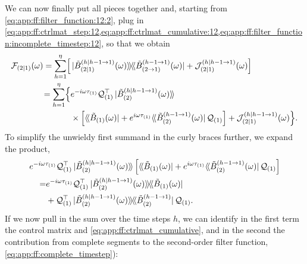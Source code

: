 We can now finally put all pieces together and, starting from \cref{eq:app:ff:filter_function:12:2}, plug in \cref{eq:app:ff:ctrlmat_step:12,eq:app:ff:ctrlmat_cumulative:12,eq:app:ff:filter_function:incomplete_timestep:12}, so that we obtain
\begin{align}
    \FF_{(2|1)}(\omega) = \sum_{h=1}^{\eta}\Bigl[
                                & \dop*{\Bt_{(2|1)}\gth{h|h-1\to 1}(\omega)}{\Bt_{(2\to1)}\gth{h-1\to 1}(\omega)}
                                    + \mc{J}_{(2|1)}\gth{h|h-1\to 1}(\omega)\Bigr] \notag \\
                        = \sum_{h=1}^{\eta}\Bigl\lbrace
                                & \e^{-\i\omega\tau_{(1)}}\liouvQ_{(1)}\transpose\dket*{\Bt_{(2)}\gth{h|h-1\to 1}(\omega)} \notag \\
                                & \times\Bigl[
                                        \dbra*{\Bt_{(1)}(\omega)} + \e^{\i\omega\tau_{(1)}}\dbra*{\Bt_{(2)}\gth{h-1\to 1}(\omega)}\liouvQ_{(1)}
                                    \Bigr] + \mc{J}_{(2|1)}\gth{h|h-1\to 1}(\omega)
                                \Bigr\rbrace.
\end{align}
To simplify the unwieldy first summand in the curly braces further, we expand the product,
\begin{align}\label{eq:app:unwieldy_term}
    \MoveEqLeft \e^{-\i\omega\tau_{(1)}}\liouvQ_{(1)}\transpose\dket*{\Bt_{(2)}\gth{h|h-1\to 1}(\omega)}\left[
                \dbra*{\Bt_{(1)}(\omega)} + \e^{\i\omega\tau_{(1)}}\dbra*{\Bt_{(2)}\gth{h-1\to 1}(\omega)}\liouvQ_{(1)}
            \right] \notag \\
        = & \e^{-\i\omega\tau_{(1)}}\liouvQ_{(1)}\transpose\dop*{\Bt_{(2)}\gth{h|h-1\to 1}(\omega)}{\Bt_{(1)}(\omega)} \\
          & + \liouvQ_{(1)}\transpose\dop*{\Bt_{(2)}\gth{h|h-1\to 1}(\omega)}{\Bt_{(2)}\gth{h-1\to 1}}\liouvQ_{(1)}. \notag
\end{align}
If we now pull in the sum over the time steps $h$, we can identify in the first term the control matrix and \cref{eq:app:ff:ctrlmat_cumulative}, and in the second the contribution from complete segments to the second-order filter function, \cref{eq:app:ff:complete_timestep}):
